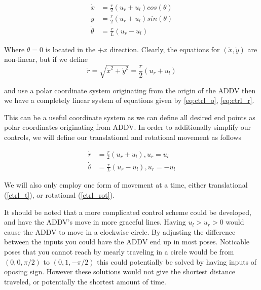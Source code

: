 \documentclass[journal]{IEEEtran}
\begin{document}
\begin{center}
\begin{align}
    \dot{x} &= \frac{r}{2}(u_r+u_l)cos(\theta)   \label{eq:ctrl_x}\\
    \dot{y} &= \frac{r}{2}(u_r+u_l)sin(\theta)   \label{eq:ctrl_y}\\
    \dot{\theta} &= \frac{r}{L}(u_r - u_l)       \label{eq:ctrl_o}
\end{align}
\end{center}

Where $\theta = 0$ is located in the $+x$  direction. Clearly, the equations for $(\dot{x}, \dot{y})$ are non-linear, but if we define
\begin{equation} \label{eq:ctrl_r}
    \dot{r} = \sqrt{\dot{x}^2 + \dot{y}^2} = \frac{r}{2}(u_r+u_l)
\end{equation}

and use a polar coordinate system originating from the origin of the ADDV 
then we have a completely linear system of equations given by \ref{eq:ctrl_o}, \ref{eq:ctrl_r}.

This can be a useful coordinate system as we can define all desired end points as polar coordinates
originating from ADDV. In order to additionally simplify our controls, we will define our translational and rotational movement as follows

\begin{center}
\begin{align}
    \dot{r} &= \frac{r}{2}(u_r+u_l), u_r = u_l               \label{eq:ctrl_t}\\
    \dot{\theta} &= \frac{r}{L}(u_r - u_l), u_r = -u_l       \label{eq:ctrl_rot}
\end{align}
\end{center}

We will also only employ one form of movement at a time, either translational (\ref{ctrl_t}), or rotational (\ref{ctrl_rot}).

It should be noted that a more complicated control scheme could be developed, and have the ADDV's move in more graceful lines. 
Having $u_l > u_r >0 $ would cause the ADDV to move in a clockwise circle. By adjusting the difference between the inputs you
could have the ADDV end up in most poses. Noticable poses that you cannot reach by mearly traveling in a circle would be 
from $(0, 0, \pi/2)$ to $(0, 1, -\pi/2)$ this could potentially be solved by having inputs of oposing sign. However these solutions 
would not give the shortest distance traveled, or potentially the shortest amount of time. 
\end{document}
